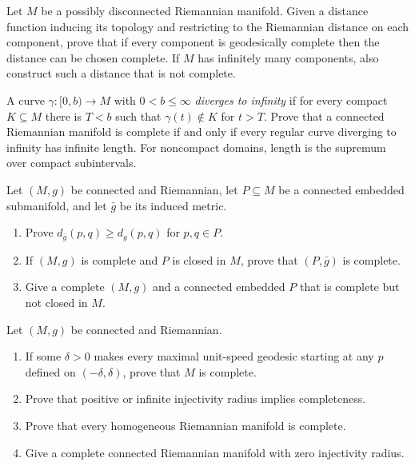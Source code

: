 \begin{exercise}
\label{prob:distance-complete-metric}

Let $M$ be a possibly disconnected Riemannian manifold.  Given a distance
function inducing its topology and restricting to the Riemannian distance on
each component, prove that if every component is geodesically complete then
the distance can be chosen complete.  If $M$ has infinitely many components,
also construct such a distance that is not complete.
\end{exercise}

\begin{exercise}
\label{prob:completeness-divergence}

A curve $\gamma:[0,b)\to M$ with $0<b\leq\infty$ \emph{diverges to infinity}
if for every compact $K\subseteq M$ there is $T<b$ such that
$\gamma(t)\notin K$ for $t>T$.  Prove that a connected Riemannian manifold is
complete if and only if every regular curve diverging to infinity has infinite
length.  For noncompact domains, length is the supremum over compact
subintervals.
\end{exercise}

\begin{exercise}
\label{prob:submanifold-distance-inequality}

Let $(M,g)$ be connected and Riemannian, let $P\subseteq M$ be a connected
embedded submanifold, and let $\bar g$ be its induced metric.
\begin{enumerate}
\item[(a)] Prove $d_{\bar g}(p,q)\geq d_g(p,q)$ for $p,q\in P$.
\item[(b)] If $(M,g)$ is complete and $P$ is closed in $M$, prove that
$(P,\bar g)$ is complete.
\item[(c)] Give a complete $(M,g)$ and a connected embedded $P$ that is
complete but not closed in $M$.
\end{enumerate}
\end{exercise}

\begin{exercise}
\label{prob:geodesic-completeness}

Let $(M,g)$ be connected and Riemannian.
\begin{enumerate}
\item[(a)] If some $\delta>0$ makes every maximal unit-speed geodesic starting
at any $p$ defined on $(-\delta,\delta)$, prove that $M$ is complete.
\item[(b)] Prove that positive or infinite injectivity radius implies
completeness.
\item[(c)] Prove that every homogeneous Riemannian manifold is complete.
\item[(d)] Give a complete connected Riemannian manifold with zero injectivity
radius.
\end{enumerate}
\end{exercise}

